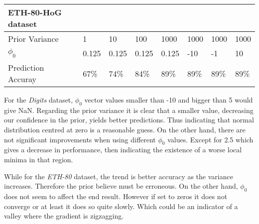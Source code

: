 \documentclass[12pt]{article}
\begin{document}
\begin{table}[h]
\begin{tabular}{l|lllllll}
ETH-80-HoG dataset &  &  &  &  &  &  &  \\ \hline
Prior Variance & \multicolumn{1}{l|}{1} & \multicolumn{1}{l|}{10} & \multicolumn{1}{l|}{100} & \multicolumn{1}{l|}{1000} & \multicolumn{1}{l|}{1000} & \multicolumn{1}{l|}{1000} & \multicolumn{1}{l|}{1000} \\ \hline
$\phi_{0}$ & \multicolumn{1}{l|}{0.125} & \multicolumn{1}{l|}{0.125} & \multicolumn{1}{l|}{0.125} & \multicolumn{1}{l|}{0.125} & \multicolumn{1}{l|}{-10} & \multicolumn{1}{l|}{-1} & \multicolumn{1}{l|}{10} \\ \hline
Prediction Accuray & \multicolumn{1}{l|}{67\%} & \multicolumn{1}{l|}{74\%} & \multicolumn{1}{l|}{84\%} & \multicolumn{1}{l|}{89\%} & \multicolumn{1}{l|}{89\%} & \multicolumn{1}{l|}{89\%} & \multicolumn{1}{l|}{89\%} \\ \hline
\end{tabular}
\end{table}

For the \textit{Digits} dataset, $\phi_{0}$ vector values smaller than -10 and bigger than 5 would give NaN.
Regarding the prior variance it is clear that a smaller value, decreasing our confidence in the prior, yields better predictions.
Thus indicating that normal distribution centred at zero is a reasonable guess.
On the other hand, there are not significant improvements when using different $\phi_{0}$ values. 
Except for 2.5 which gives a decrease in performance, then indicating the existence of a worse local minima in that region.

While for the \textit{ETH-80} dataset, the trend is better accuracy as the variance increases.
Therefore the prior believe must be erroneous.
On the other hand, $\phi_{0}$ does not seem to affect the end result.
However if set to zeros it does not converge or at least it does so quite slowly.
Which could be an indicator of a valley where the gradient is zigzagging.

 
\end{document}
